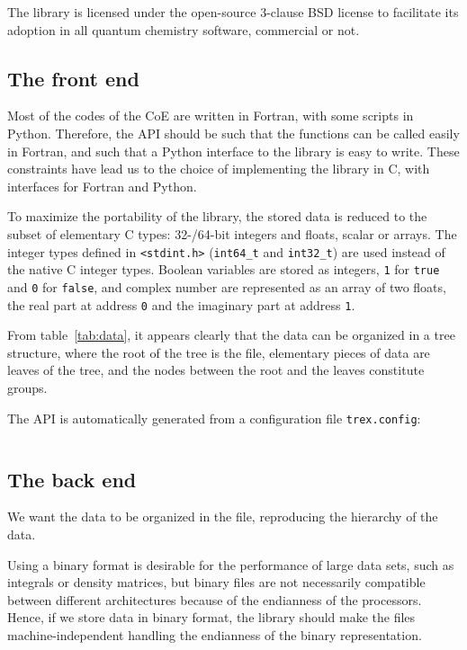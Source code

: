 The library is licensed under the open-source 3-clause BSD license to facilitate
its adoption in all quantum chemistry software, commercial or not.

\subsection{The front end}


Most of the codes of the \ac{CoE} are written in Fortran, with some
scripts in Python. Therefore, the \ac{API} should be such that the
functions can be called easily in Fortran, and such that a Python
interface to the library is easy to write. These constraints have lead
us to the choice of implementing the library in C, with interfaces for
Fortran and Python.

To maximize the portability of the library, the stored data is reduced
to the subset of elementary C types: 32-/64-bit integers and floats,
scalar or arrays. The integer types defined in \texttt{<stdint.h>}
(\texttt{int64_t} and \texttt{int32_t}) are
used instead of the native C integer types.
Boolean variables are stored as integers, \texttt{1} for \texttt{true}
and \texttt{0} for \texttt{false}, and complex number are represented
as an array of two floats, the real part at address \texttt{0} and the
imaginary part at address \texttt{1}.

From table~\ref{tab:data}, it appears clearly that the data can be
organized in a tree structure, where the root of the tree is the file,
elementary pieces of data are leaves of the tree, and the nodes
between the root and the leaves constitute groups.

The \ac{API} is automatically generated from a configuration file
\texttt{trex.config}:
\inputminted[fontsize=\footnotesize]{fortran}{trex.config}



\subsection{The back end}

We want the data to be organized in the file, reproducing the
hierarchy of the data.

Using a binary format is desirable for the performance of large data
sets, such as integrals or density matrices, but binary files are not
necessarily compatible between different architectures because of the
endianness of the processors. Hence, if we store data in binary
format, the library should make the files machine-independent handling
the endianness of the binary representation.

